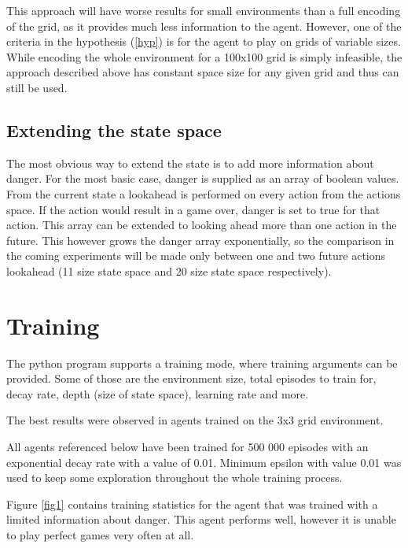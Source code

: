 \documentclass[lettersize,journal]{IEEEtran}
\begin{document}
This approach will have worse results for small environments than a full encoding of the grid, as it provides
much less information to the agent. However, one of the criteria in the hypothesis (\ref{hyp}) is for the
agent to play on grids of variable sizes. While encoding the whole environment for a 100x100 grid is
simply infeasible, the approach described above has constant space size for any given grid and thus can still
be used.

\subsection{Extending the state space}
The most obvious way to extend the state is to add more
information about danger. For the most basic case, danger
is supplied as an array of boolean values. From the current
state a lookahead is performed on every action from
the actions space. If the action would result in a game
over, danger is set to true for that action. This
array can be extended to looking ahead more than one action
in the future. This however grows the danger array
exponentially, so the comparison in the coming experiments
will be made only between one and two future actions lookahead
(11 size state space and 20 size state space respectively).


\section{Training} \label{training}
The python program supports a training mode, where
training arguments can be provided. Some of those are the environment size,
total episodes to train for, decay rate, depth (size of state space),
learning rate and more.

The best results were observed in agents trained on the 3x3 grid environment.

All agents referenced below have been trained for 500 000 episodes
with an exponential decay rate with a value of 0.01. Minimum epsilon with value 0.01
was used to keep some exploration throughout the whole training
process.

Figure \ref{fig1} contains training statistics for the agent that was trained
with a limited information about danger. This agent performs well, however
it is unable to play perfect games very often at all.
\end{document}
